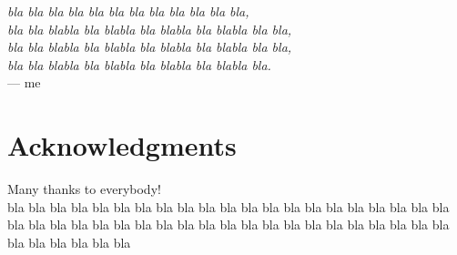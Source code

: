 
\begin{flushright}{\slshape    
    bla bla bla bla bla bla bla bla bla bla bla bla, \\ 
    bla bla blabla bla blabla bla blabla bla blabla bla bla, \\ 
    bla bla blabla bla blabla bla blabla bla blabla bla bla, \\
    bla bla blabla bla blabla bla blabla bla blabla bla. } \\ \medskip
    --- me
\end{flushright}



\bigskip

\begingroup
\let\clearpage\relax
\let\cleardoublepage\relax
\let\cleardoublepage\relax
\chapter*{Acknowledgments}

Many thanks to everybody!\\
bla bla bla bla bla bla bla bla bla bla bla bla
bla bla bla bla bla bla bla bla bla bla bla bla
bla bla bla bla bla bla bla bla bla bla bla bla
bla bla bla bla bla bla bla bla bla bla bla bla

\endgroup



